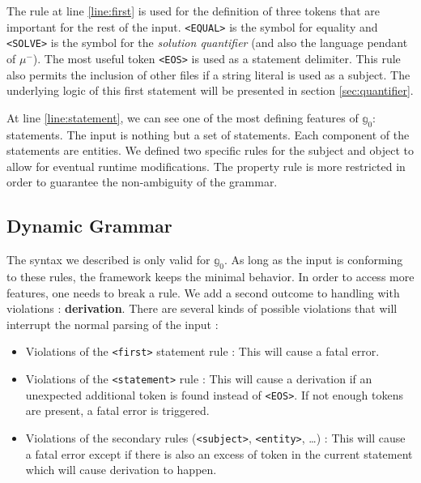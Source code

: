 \documentclass[11pt,a4paper,twoside,openright,titlepage,numbers=noenddot,headinclude,cleardoublepage=empty,openany]{scrreprt}
\theoremstyle{plain}
\theoremstyle{definition}
\theoremstyle{remark}
\newcommand{\passthrough}[1]{#1}
\providecommand{\tightlist}{%
  \setlength{\itemsep}{0pt}\setlength{\parskip}{0pt}}
\newcommand{\bb}{\mathbb}
\begin{document}
The rule at line \ref{line:first} is used for the definition of three
tokens that are important for the rest of the input.
\passthrough{\lstinline!<EQUAL>!} is the symbol for equality and
\passthrough{\lstinline!<SOLVE>!} is the symbol for the \emph{solution
quantifier} (and also the language pendant of \(\mu^-\)). The most
useful token \passthrough{\lstinline!<EOS>!} is used as a statement
delimiter. This rule also permits the inclusion of other files if a
string literal is used as a subject. The underlying logic of this first
statement will be presented in section \ref{sec:quantifier}.

At line \ref{line:statement}, we can see one of the most defining
features of \(\bb{g}_0\): statements. The input is nothing but a set of
statements. Each component of the statements are entities. We defined
two specific rules for the subject and object to allow for eventual
runtime modifications. The property rule is more restricted in order to
guarantee the non-ambiguity of the grammar.

\hypertarget{sec:derivation}{%
\subsection{Dynamic Grammar}\label{sec:derivation}}

The syntax we described is only valid for \(\bb{g}_0\). As long as the
input is conforming to these rules, the framework keeps the minimal
behavior. In order to access more features, one needs to break a rule.
We add a second outcome to handling with violations :
\textbf{derivation}. There are several kinds of possible violations that
will interrupt the normal parsing of the input :

\begin{itemize}
\tightlist
\item
  Violations of the \passthrough{\lstinline!<first>!} statement rule :
  This will cause a fatal error.
\item
  Violations of the \passthrough{\lstinline!<statement>!} rule : This
  will cause a derivation if an unexpected additional token is found
  instead of \passthrough{\lstinline!<EOS>!}. If not enough tokens are
  present, a fatal error is triggered.
\item
  Violations of the secondary rules
  (\passthrough{\lstinline!<subject>!},
  \passthrough{\lstinline!<entity>!}, \ldots{}) : This will cause a
  fatal error except if there is also an excess of token in the current
  statement which will cause derivation to happen.
\end{itemize}
\end{document}
